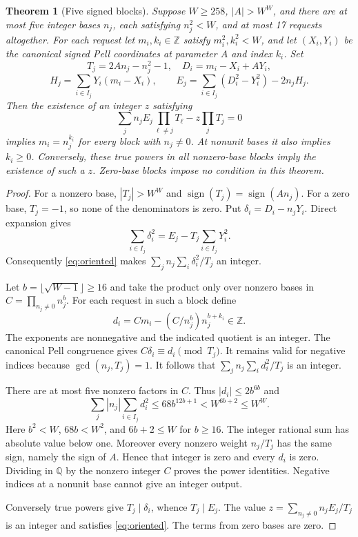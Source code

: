 \documentclass[11pt]{article}
\newtheorem{theorem}{Theorem}[section]
\newcommand{\Z}{\mathbb Z}
\begin{document}
\begin{theorem}[Five signed blocks]\label{thm:pooling}
Suppose $W\ge258$, $|A|>W^W$, and there are at most five integer bases
$n_j$, each satisfying $n_j^2<W$, and at most 17 requests altogether.
For each request let $m_i,k_i\in\Z$ satisfy $m_i^2,k_i^2<W$, and let $(X_i,Y_i)$ be
the canonical signed Pell coordinates at parameter $A$ and index $k_i$.
Set
\[
 T_j=2An_j-n_j^2-1,\quad D_i=m_i-X_i+AY_i,
\]
\[
 H_j=\sum_{i\in I_j}Y_i(m_i-X_i),\qquad
 E_j=\sum_{i\in I_j}(D_i^2-Y_i^2)-2n_jH_j.
\]
Then the existence of an integer $z$ satisfying
\begin{equation}\label{eq:oriented}
 \sum_j n_jE_j\prod_{\ell\ne j}T_\ell
                  -z\prod_jT_j=0
\end{equation}
implies $m_i=n_j^{k_i}$ for every block with $n_j\ne0$.
At nonunit bases it also implies $k_i\ge0$. Conversely, these true
powers in all nonzero-base blocks imply the existence of such a $z$.
Zero-base blocks impose no condition in this theorem.
\end{theorem}
\begin{proof}
For a nonzero base, $|T_j|>W^W$ and
$\operatorname{sign}(T_j)=\operatorname{sign}(An_j)$.
For a zero base, $T_j=-1$, so none of the denominators is zero.
Put $\delta_i=D_i-n_jY_i$. Direct expansion gives
\[
 \sum_{i\in I_j}\delta_i^2=E_j-T_j\sum_{i\in I_j}Y_i^2.
\]
Consequently \eqref{eq:oriented} makes
$\sum_j n_j\sum_i\delta_i^2/T_j$ an integer.

Let $b=\lfloor\sqrt{W-1}\rfloor\ge16$ and take the product only over
nonzero bases in
$C=\prod_{n_j\ne0}n_j^b$. For each request in such a block define
\[
 d_i=Cm_i-(C/n_j^b)n_j^{b+k_i}\in\Z.
\]
The exponents are nonnegative and the indicated quotient is an integer.
The canonical Pell congruence gives $C\delta_i\equiv d_i\pmod{T_j}$.
It remains valid for negative indices because $\gcd(n_j,T_j)=1$.
It follows that $\sum_j n_j\sum_i d_i^2/T_j$ is an integer.

There are at most five nonzero factors in $C$. Thus
$|d_i|\le2b^{6b}$ and
\[
 \sum_j |n_j|\sum_{i\in I_j}d_i^2
 \le68b^{12b+1}<W^{6b+2}\le W^W.
\]
Here $b^2<W$, $68b<W^2$, and $6b+2\le W$ for $b\ge16$.
The integer rational sum has absolute value below one. Moreover every
nonzero weight $n_j/T_j$ has the same sign, namely the sign of $A$.
Hence that integer is zero and every $d_i$ is zero. Dividing in $\mathbb Q$
by the nonzero integer $C$ proves the power identities. Negative indices
at a nonunit base cannot give an integer output.

Conversely true powers give $T_j\mid\delta_i$, whence $T_j\mid E_j$.
The value $z=\sum_{n_j\ne0}n_jE_j/T_j$ is an integer and satisfies
\eqref{eq:oriented}. The terms from zero bases are zero.
\end{proof}
\end{document}
